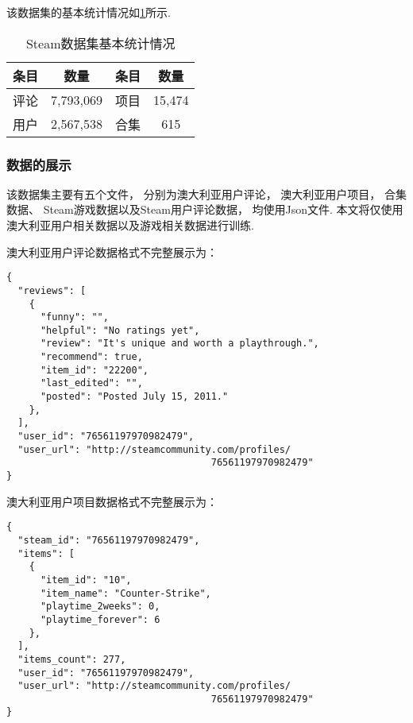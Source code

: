该数据集的基本统计情况如\cref{tb:dataset}所示.

\begin{table}[!htbp]
  \begin{center}
    \caption{Steam数据集基本统计情况}\label{tb:dataset}
    \begin{tabular}{cccc}
      \toprule
      条目 & 数量        & 条目 & 数量     \\
      \midrule
      评论 & 7,793,069 & 项目 & 15,474 \\
      用户 & 2,567,538 & 合集 & 615    \\
      \bottomrule
    \end{tabular}
  \end{center}
\end{table}

\subsubsection{数据的展示}

该数据集主要有五个文件，
分别为澳大利亚用户评论，
澳大利亚用户项目，
合集数据、
Steam游戏数据以及Steam用户评论数据，
均使用Json文件.
本文将仅使用澳大利亚用户相关数据以及游戏相关数据进行训练.

澳大利亚用户评论数据格式不完整展示为：
\begin{verbatim}
{
  "reviews": [
    {
      "funny": "",
      "helpful": "No ratings yet",
      "review": "It's unique and worth a playthrough.",
      "recommend": true,
      "item_id": "22200",
      "last_edited": "",
      "posted": "Posted July 15, 2011."
    },
  ],
  "user_id": "76561197970982479",
  "user_url": "http://steamcommunity.com/profiles/
                                    76561197970982479"
}
\end{verbatim}

澳大利亚用户项目数据格式不完整展示为：
\begin{verbatim}
{
  "steam_id": "76561197970982479",
  "items": [
    {
      "item_id": "10",
      "item_name": "Counter-Strike",
      "playtime_2weeks": 0,
      "playtime_forever": 6
    },
  ],
  "items_count": 277,
  "user_id": "76561197970982479",
  "user_url": "http://steamcommunity.com/profiles/
                                    76561197970982479"
}
\end{verbatim}

